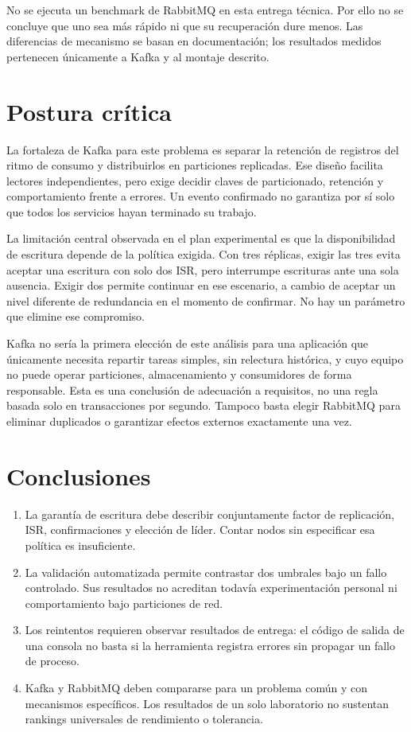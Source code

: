 \documentclass[11pt,a4paper]{article}
\begin{document}
No se ejecuta un benchmark de RabbitMQ en esta entrega técnica. Por ello no se concluye que uno sea más rápido ni que su recuperación dure menos. Las diferencias de mecanismo se basan en documentación; los resultados medidos pertenecen únicamente a Kafka y al montaje descrito.

\section{Postura crítica}
La fortaleza de Kafka para este problema es separar la retención de registros del ritmo de consumo y distribuirlos en particiones replicadas. Ese diseño facilita lectores independientes, pero exige decidir claves de particionado, retención y comportamiento frente a errores. Un evento confirmado no garantiza por sí solo que todos los servicios hayan terminado su trabajo.

La limitación central observada en el plan experimental es que la disponibilidad de escritura depende de la política exigida. Con tres réplicas, exigir las tres evita aceptar una escritura con solo dos ISR, pero interrumpe escrituras ante una sola ausencia. Exigir dos permite continuar en ese escenario, a cambio de aceptar un nivel diferente de redundancia en el momento de confirmar. No hay un parámetro que elimine ese compromiso.

Kafka no sería la primera elección de este análisis para una aplicación que únicamente necesita repartir tareas simples, sin relectura histórica, y cuyo equipo no puede operar particiones, almacenamiento y consumidores de forma responsable. Esta es una conclusión de adecuación a requisitos, no una regla basada solo en transacciones por segundo. Tampoco basta elegir RabbitMQ para eliminar duplicados o garantizar efectos externos exactamente una vez.

\section{Conclusiones}
\begin{enumerate}
\item La garantía de escritura debe describir conjuntamente factor de replicación, ISR, confirmaciones y elección de líder. Contar nodos sin especificar esa política es insuficiente.
\item La validación automatizada permite contrastar dos umbrales bajo un fallo controlado. Sus resultados no acreditan todavía experimentación personal ni comportamiento bajo particiones de red.
\item Los reintentos requieren observar resultados de entrega: el código de salida de una consola no basta si la herramienta registra errores sin propagar un fallo de proceso.
\item Kafka y RabbitMQ deben compararse para un problema común y con mecanismos específicos. Los resultados de un solo laboratorio no sustentan rankings universales de rendimiento o tolerancia.
\end{enumerate}
\end{document}
